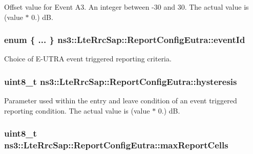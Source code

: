 Offset value for Event A3. An integer between -\/30 and 30. The actual value is (value $\ast$ 0.) dB. 

\subsubsection[{\texorpdfstring{event\+Id}{eventId}}]{\setlength{\rightskip}{0pt plus 5cm}enum \{ ... \}   ns3\+::\+Lte\+Rrc\+Sap\+::\+Report\+Config\+Eutra\+::event\+Id}\hypertarget{structns3_1_1LteRrcSap_1_1ReportConfigEutra_a1fbe931cc9584614d20f4affbce70d8a}{}\label{structns3_1_1LteRrcSap_1_1ReportConfigEutra_a1fbe931cc9584614d20f4affbce70d8a}


Choice of E-\/\+U\+T\+RA event triggered reporting criteria. 

\subsubsection[{\texorpdfstring{hysteresis}{hysteresis}}]{\setlength{\rightskip}{0pt plus 5cm}uint8\+\_\+t ns3\+::\+Lte\+Rrc\+Sap\+::\+Report\+Config\+Eutra\+::hysteresis}\hypertarget{structns3_1_1LteRrcSap_1_1ReportConfigEutra_a1fb9169ea261ba20af6a0c18fcc04fa9}{}\label{structns3_1_1LteRrcSap_1_1ReportConfigEutra_a1fb9169ea261ba20af6a0c18fcc04fa9}


Parameter used within the entry and leave condition of an event triggered reporting condition. The actual value is (value $\ast$ 0.) dB. 

\subsubsection[{\texorpdfstring{max\+Report\+Cells}{maxReportCells}}]{\setlength{\rightskip}{0pt plus 5cm}uint8\+\_\+t ns3\+::\+Lte\+Rrc\+Sap\+::\+Report\+Config\+Eutra\+::max\+Report\+Cells}\hypertarget{structns3_1_1LteRrcSap_1_1ReportConfigEutra_a1481b0d3484ffe7852fdb4c6300d340c}{}\label{structns3_1_1LteRrcSap_1_1ReportConfigEutra_a1481b0d3484ffe7852fdb4c6300d340c}



